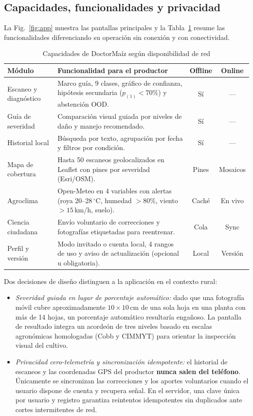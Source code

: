 \documentclass[conference,letterpaper]{IEEEtran}
\begin{document}
\subsection{Capacidades, funcionalidades y privacidad}
La Fig.~\ref{fig:app} muestra las pantallas principales y la Tabla~\ref{tab:capacidades} resume las funcionalidades diferenciando su operación sin conexión y con conectividad.

\begin{table}[!t]
\caption{Capacidades de DoctorMaíz según disponibilidad de red}
\label{tab:capacidades}
\centering
\scriptsize
\setlength{\tabcolsep}{3pt}
\begin{tabularx}{\columnwidth}{@{}>{\raggedright\arraybackslash}p{2.05cm}>{\raggedright\arraybackslash}Xcc@{}}
\toprule
\textbf{Módulo} & \textbf{Funcionalidad para el productor} & \textbf{Offline} & \textbf{Online} \\
\midrule
Escaneo y diagnóstico & Marco guía, 9 clases, gráfico de confianza, hipótesis secundaria ($p_{(1)}<70\%$) y abstención OOD. & Sí & --- \\
Guía de severidad & Comparación visual guiada por niveles de daño y manejo recomendado. & Sí & --- \\
Historial local & Búsqueda por texto, agrupación por fecha y filtros por condición. & Sí & --- \\
Mapa de cobertura & Hasta 50 escaneos geolocalizados en Leaflet con pines por severidad (Esri/OSM). & Pines & Mosaicos \\
Agroclima & Open-Meteo en 4 variables con alertas (roya 20--28\,$^\circ$C, humedad $>80\%$, viento $>15$\,km/h, suelo). & Caché & En vivo \\
Ciencia ciudadana & Envío voluntario de correcciones y fotografías etiquetadas para reentrenar. & Cola & Sync \\
Perfil y versión & Modo invitado o cuenta local, 4 rangos de uso y aviso de actualización (opcional u obligatoria). & Local & Versión \\
\bottomrule
\end{tabularx}
\end{table}

Dos decisiones de diseño distinguen a la aplicación en el contexto rural:
\begin{itemize}
\item \textit{Severidad guiada en lugar de porcentaje automático:} dado que una fotografía móvil cubre aproximadamente $10\times10$\,cm de una sola hoja en una planta con más de 14 hojas, un porcentaje automático resultaría engañoso. La pantalla de resultado integra un acordeón de tres niveles basado en escalas agronómicas homologadas (Cobb y CIMMYT) para orientar la inspección visual del cultivo.
\item \textit{Privacidad cero-telemetría y sincronización idempotente:} el historial de escaneos y las coordenadas GPS del productor \textbf{nunca salen del teléfono}. Únicamente se sincronizan las correcciones y los aportes voluntarios cuando el usuario dispone de cuenta y recupera señal. En el servidor, una clave única por usuario y registro garantiza reintentos idempotentes sin duplicados ante cortes intermitentes de red.
\end{itemize}
\end{document}
